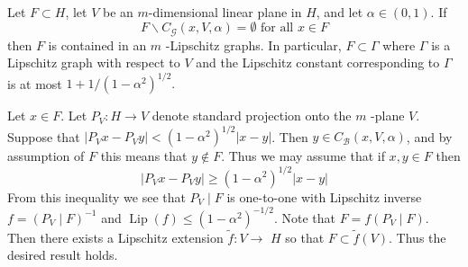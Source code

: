 \begin{theorem} $ $\\
    Let $F \subset H$, let $V$ be an $m$-dimensional linear plane in $H$, and let $\alpha \in(0,1) .$ If
$$
F \backslash C_{\mathcal{G}}(x, V, \alpha)=\emptyset \text { for all } x \in F
$$
then $F$ is contained in an $m$ -Lipschitz graphs. In particular, $F \subset \Gamma$ where $\Gamma$ is a Lipschitz graph with respect to $V$ and the Lipschitz constant corresponding to $\Gamma$ is at most $1+1 /\left(1-\alpha^{2}\right)^{1 / 2} .$
\end{theorem}
\proof Let $x \in F$. Let $P_{V}: H \rightarrow V$ denote standard projection onto the $m$ -plane $V$. Suppose that $\left|P_{V} x-P_{V} y\right|<\left(1-\alpha^{2}\right)^{1 / 2}|x-y|$. Then $y \in C_{\mathcal{B}}(x, V, \alpha)$, and by assumption of $F$ this means that $y \notin F$. Thus we may assume that if $x, y \in F$ then
$$
\left|P_{V} x-P_{V} y\right| \geq\left(1-\alpha^{2}\right)^{1 / 2}|x-y|
$$
From this inequality we see that $P_{V} \mid F$ is one-to-one with Lipschitz inverse $f=\left(P_{V} \mid F\right)^{-1}$ and $\operatorname{Lip}(f) \leq\left(1-\alpha^{2}\right)^{-1 / 2}$. Note that $F=f\left(P_{V} \mid F\right)$. Then there exists a Lipschitz extension $\tilde{f}: V \rightarrow$ $H$ so that $F \subset \tilde{f}(V)$. Thus the desired result holds. 


